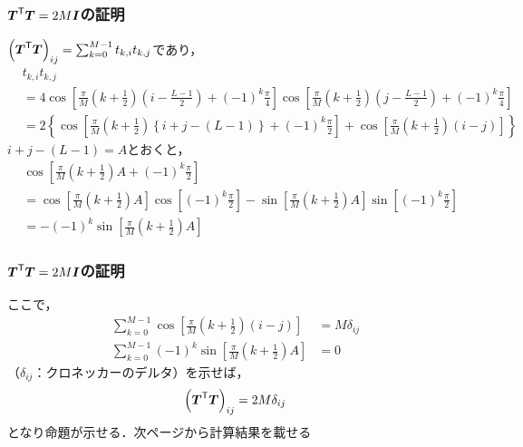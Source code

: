 \documentclass[14pt,xcolor=dvipsnames,table,dvipdfmx]{beamer}
\begin{document}
\begin{frame}[c]
    \frametitle{$\boldsymbol{T}^{\mathsf{T}} \boldsymbol{T} = 2M\boldsymbol{I}$の証明}
    $\left( \boldsymbol{T}^{\mathsf{T}} \boldsymbol{T} \right)_{ij} = \sum_{k = 0}^{M - 1} t_{k,i} t_{k,j}$であり，
    \scriptsize
    \begin{align*}
        & t_{k,i} t_{k,j} \\
        &= 4 \cos\left[ \frac{\pi}{M} \left( k + \frac{1}{2} \right) \left( i - \frac{L - 1}{2} \right) + (-1)^{k}\frac{\pi}{4} \right] \cos\left[ \frac{\pi}{M} \left( k + \frac{1}{2} \right) \left( j - \frac{L - 1}{2} \right) + (-1)^{k}\frac{\pi}{4} \right] \\
        &= 2 \left\{ \cos\left[ \frac{\pi}{M} \left( k + \frac{1}{2} \right) \left\{ i + j - (L - 1) \right\} + (-1)^{k} \frac{\pi}{2} \right] + \cos\left[ \frac{\pi}{M} \left( k + \frac{1}{2} \right) \left( i - j \right) \right] \right\}
    \end{align*}
    \normalsize
    $i + j - (L - 1) = A$とおくと，
    \scriptsize
    \begin{align*}
        & \cos\left[ \frac{\pi}{M} \left( k + \frac{1}{2} \right)A + (-1)^{k}\frac{\pi}{2} \right] \\
        &= \cos\left[ \frac{\pi}{M} \left( k + \frac{1}{2} \right)A \right] \cos\left[(-1)^{k}\frac{\pi}{2} \right] - \sin\left[ \frac{\pi}{M} \left( k + \frac{1}{2} \right)A \right] \sin\left[(-1)^{k}\frac{\pi}{2} \right] \\
        &= -(-1)^{k} \sin \left[ \frac{\pi}{M} \left( k + \frac{1}{2} \right)A \right]
    \end{align*}
\end{frame}

\begin{frame}[c]
    \frametitle{$\boldsymbol{T}^{\mathsf{T}} \boldsymbol{T} = 2M\boldsymbol{I}$の証明}
    ここで，
    \begin{align}
        \sum_{k = 0}^{M - 1}\cos\left[ \frac{\pi}{M} \left( k + \frac{1}{2} \right) \left( i - j \right) \right] &= M\delta_{ij} \label{eq:orthogonal_condition_cos} \\
        \sum_{k = 0}^{M - 1}(-1)^{k} \sin \left[ \frac{\pi}{M} \left( k + \frac{1}{2} \right)A \right] &= 0 \label{eq:orthogonal_condition_sin}
    \end{align}
    （$\delta_{ij}$：クロネッカーのデルタ）を示せば，
    \begin{align*}
        \left( \boldsymbol{T}^{\mathsf{T}} \boldsymbol{T} \right)_{ij} = 2M \delta_{ij}
    \end{align*}
    となり命題が示せる．次ページから計算結果を載せる
\end{frame}
\end{document}
